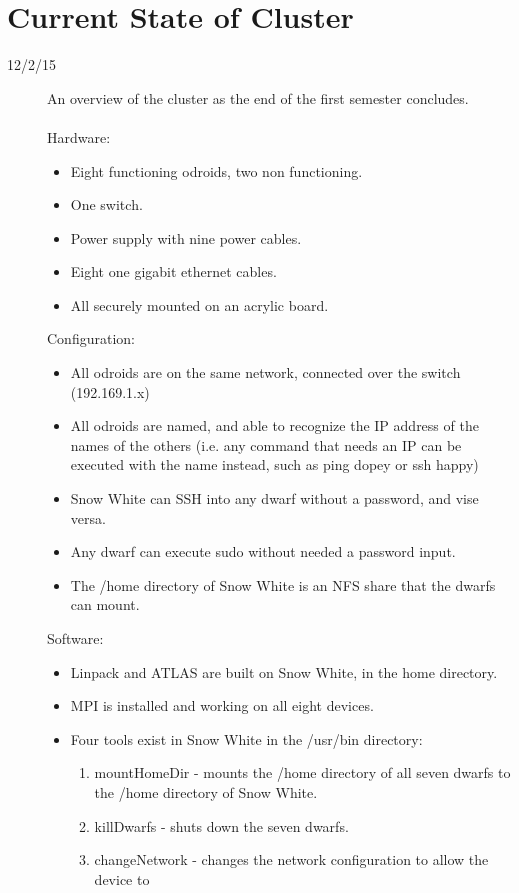 \section{Current State of Cluster}
\begin{description}
\item [12/2/15] An overview of the cluster as the end of the first semester concludes. \\ \\
Hardware:
\begin{itemize}
 	\item Eight functioning odroids, two non functioning.
	\item One switch.
	\item Power supply with nine power cables.
	\item Eight one gigabit ethernet cables.
	\item All securely mounted on an acrylic board. 
\end{itemize}
Configuration:
\begin{itemize}
	\item All odroids are on the same network, connected over the switch (192.169.1.x)
	\item All odroids are named, and able to recognize the IP address of the names of
    the others (i.e. any command that needs an IP can be executed with the name
    instead, such as ping dopey or ssh happy)
	\item Snow White can SSH into any dwarf without a password, and vise versa.
	\item Any dwarf can execute sudo without needed a password input.
	\item The /home directory of Snow White is an NFS share that the dwarfs can mount.
\end{itemize}
Software:
\begin{itemize}
	\item Linpack and ATLAS are built on Snow White, in the home directory.
	\item MPI is installed and working on all eight devices.
	\item Four tools exist in Snow White in the /usr/bin directory:
	\begin{enumerate}
      	\item mountHomeDir - mounts the /home directory of all seven dwarfs to the /home
        directory of Snow White.
      	\item killDwarfs - shuts down the seven dwarfs.
      	\item changeNetwork - changes the network configuration to allow the device to

\end{enumerate}
\end{itemize}
\end{description}
